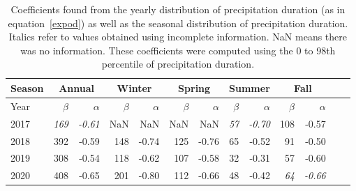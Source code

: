 \begin{table}[bh]
  \begin{center}
    \begin{tabular}{|l|*{11}{r|}r|}
      \hline
      Season    &       \multicolumn{2}{|c|}{Annual}          & \multicolumn{2}{|c|}{Winter}& \multicolumn{2}{|c|}{Spring}  & \multicolumn{2}{|c|}{Summer} &\multicolumn{2}{|c|}{Fall}  \\
      \hline
      Year      & $\beta $ & $\alpha$  & $\beta $ & $\alpha$ & $\beta $ & $\alpha$ & $\beta $ & $\alpha$ & $\beta $ & $\alpha$\\
      \hline
      2017      & \textit{169}  & \textit{-0.61}  & NaN & NaN & NaN & NaN & \textit{57}  & \textit{-0.70}  & 108  & -0.57  \\
      2018      & 392           & -0.59  & 148 & -0.74 & 125 & -0.76 & 65  & -0.52  & 91 & -0.50  \\
      2019      & 308           & -0.54  & 118  & -0.62 & 107 & -0.58 & 32 & -0.31  & 57 &  -0.60 \\
      2020      & 408           & -0.65   & 201  & -0.80 & 112  & -0.66 & 48  & -0.42 & \textit{64} & \textit{-0.66}\\
      \hline
    \end{tabular}
  \end{center}
\caption[Year comparison of coefficients of precipitation duration up to its
  98th percentile]{\label{firsttable}Coefficients found from the yearly
  distribution of precipitation duration (as in equation~\ref{expod}) as
  well as the seasonal distribution of precipitation duration. Italics refer
  to values obtained using incomplete information. NaN means there was no
  information. These coefficients were computed using the 0 to 98th
  percentile of precipitation duration.}
\end{table}
